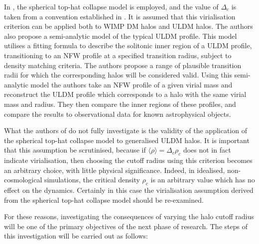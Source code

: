 In \cite{Robles:2018fur}, the spherical top-hat collapse model is employed, and the value of $\Delta_c$ is taken from a convention established in \cite{Bryan:1997dn}. It is assumed that this virialisation criterion can be applied both to WIMP DM halos and ULDM halos. The authors also propose a semi-analytic model of the typical ULDM profile. This model utilises a fitting formula to describe the solitonic inner region of a ULDM profile, transitioning to an NFW profile at a specified transition radius, subject to density matching criteria. The authors propose a range of plausible transition radii for which the corresponding halos will be considered valid. Using this semi-analytic model the authors take an NFW profile of a given virial mass and reconstruct the ULDM profile which corresponds to a halo with the same virial mass and radius. They then compare the inner regions of these profiles, and compare the results to observational data for known astrophysical objects. 

What the authors of \cite{Robles:2018fur} do not fully investigate is the validity of the application of the spherical top-hat collapse model to generalised ULDM halos. It is important that this assumption be scrutinised, because if $\langle\rho\rangle=\Delta_c\rho_c$ does not in fact indicate virialisation, then choosing the cutoff radius using this criterion becomes an arbitrary choice, with little physical significance. Indeed, in idealised, non-cosmological simulations, the critical density $\rho_c$ is an arbitrary value which has no effect on the dynamics. Certainly in this case the virialisation assumption derived from the spherical top-hat collapse model should be re-examined.

For these reasons, investigating the consequences of varying the halo cutoff radius will be one of the primary objectives of the next phase of research. The steps of this investigation will be carried out as follows:

